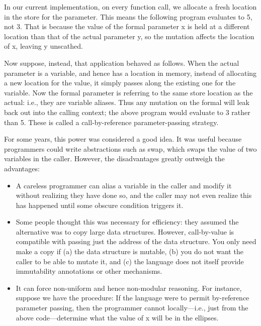 
In our current implementation, on every function call, we allocate a fresh
location in the store for the parameter. This means the following program
evaluates to 5, not 3. That is because the value of the formal parameter x is
held at a different location than that of the actual parameter y, so the
mutation affects the location of x, leaving y unscathed.

Now suppose, instead, that application behaved as follows. When the actual
parameter is a variable, and hence has a location in memory, instead of
allocating a new location for the value, it simply passes along the existing one
for the variable. Now the formal parameter is referring to the same store
location as the actual: i.e., they are variable aliases. Thus any mutation on
the formal will leak back out into the calling context; the above program would
evaluate to 3 rather than 5. These is called a call-by-reference
parameter-passing strategy.

For some years, this power was considered a good idea. It was useful because
programmers could write abstractions such as swap, which swaps the value of two
variables in the caller. However, the disadvantages greatly outweigh the
advantages:
\begin{itemize}
  \item 
A careless programmer can alias a variable in the caller and modify it without
realizing they have done so, and the caller may not even realize this has
happened until some obscure condition triggers it.
  \item 
Some people thought this was necessary for efficiency: they assumed the
alternative was to copy large data structures. However, call-by-value is
compatible with passing just the address of the data structure. You only need
make a copy if (a) the data structure is mutable, (b) you do not want the caller
to be able to mutate it, and (c) the language does not itself provide
immutability annotations or other mechanisms.
  \item 
It can force non-uniform and hence non-modular reasoning. For instance, suppose
we have the procedure:
If the language were to permit by-reference parameter passing, then the
programmer cannot locally—i.e., just from the above code—determine what the
value of x will be in the ellipses.
\end{itemize}

